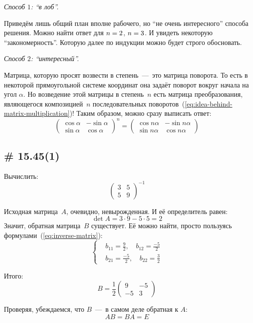 \documentclass[a4paper,12pt]{article}
\theoremstyle{remark}
\begin{document}
  \begin{solution}
    \leavevmode
    
    \emph{Способ $1$: ``в лоб''.}
    
    Приведём лишь общий план вполне рабочего, но ``не очень интересного'' способа решения.
    Можно найти ответ для $n \hm= 2$, $n \hm= 3$.
    И увидеть некоторую ``закономерность''.
    Которую далее по индукции можно будет строго обосновать.
    
    \medskip
    
    \emph{Способ $2$: ``интересный''.}
    
    Матрица, которую просят возвести в степень~---~это матрица поворота.
    То есть в некоторой прямоугольной системе координат она задаёт поворот вокруг начала на угол $\alpha$.
    Но возведение этой матрицы в степень~$n$ есть матрица преобразования, являющегося композицией~$n$ последовательных поворотов~(\ref{eq:idea-behind-matrix-multiplication})!
    Таким образом, можно сразу выписать ответ:
    \[
      \begin{pmatrix}
        \cos \alpha & -\sin \alpha\\
        \sin \alpha & \cos \alpha
      \end{pmatrix}^n
      = \begin{pmatrix}
        \cos n\alpha & -\sin n\alpha\\
        \sin n\alpha & \cos n\alpha
      \end{pmatrix}
    \]
  \end{solution}
  
  
  \subsection{\# 15.45(1)}
  
  Вычислить:
  \[
    \begin{pmatrix}
      3 & 5\\
      5 & 9
    \end{pmatrix}^{-1}
  \]
  
  \begin{solution}
    Исходная матрица~$A$, очевидно, невырожденная.
    И её определитель равен:
    \[
      \det A = 3 \cdot 9 - 5 \cdot 5 = 2
    \]
    Значит, обратная матрица~$B$ существует.
    Её можно найти, просто пользуясь формулами~(\ref{eq:inverse-matrix}):
    \[
      \left\{
        \begin{aligned}
          &b_{11} = \frac{9}{2},\quad b_{12} = \frac{-5}{2}\\
          &b_{21} = \frac{-5}{2},\quad b_{22} = \frac{3}{2}
        \end{aligned}
      \right.
    \]
    
    Итого:
    \[
      B = \frac{1}{2} \begin{pmatrix}
        9 & -5\\
        -5 & 3
      \end{pmatrix}
    \]
    
    Проверяя, убеждаемся, что $B$~---~в самом деле обратная к $A$:
    \[
      AB = BA = E
    \]
  \end{solution}
  
\end{document}
